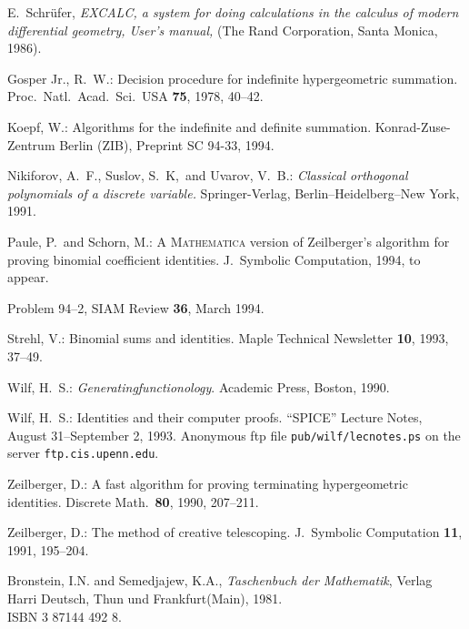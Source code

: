 \begin{thebibliography}{999}
	E.~Schr{\"u}fer, {\em
	EXCALC, a system for doing calculations in the calculus of modern
	differential geometry, User's manual,}
	(The Rand Corporation, Santa Monica, 1986).


Gosper Jr., R.\ W.:
Decision procedure for indefinite hypergeometric
summation. Proc.\ Natl.\ Acad.\ Sci.\ USA \textbf{75}, 1978, 40--42.

Koepf, W.:
Algorithms for the indefinite and definite summation.
Konrad-Zuse-Zentrum Berlin (ZIB), Preprint SC 94-33, 1994.


Nikiforov, A.\ F., Suslov, S.\ K,\ and Uvarov, V.\ B.: {\sl Classical
orthogonal polynomials of a discrete variable.} Springer-Verlag,
Berlin--Heidelberg--New York, 1991.

Paule, P.\ and Schorn, M.: A \textsc{Mathematica} version of Zeilberger's
algorithm for proving binomial coefficient identities. J.\ Symbolic
Computation, 1994, to appear.

Problem 94--2, SIAM Review \textbf{36}, March 1994.

Strehl, V.:
Binomial sums and identities. Maple Technical Newsletter \textbf{10}, 1993, 37--49.

Wilf, H.\ S.:
{\sl Generatingfunctionology}. Academic Press, Boston, 1990.

Wilf, H.\ S.:
Identities and their computer proofs. ``SPICE'' Lecture Notes,
August 31--September 2, 1993.
Anonymous ftp file \texttt{pub/wilf/lecnotes.ps} on
the server \texttt{ftp.cis.upenn.edu}.

Zeilberger, D.:
A fast algorithm for proving terminating hypergeometric identities.
Discrete Math.\ \textbf{80}, 1990, 207--211.

Zeilberger, D.:
The method of creative telescoping.
J.\ Symbolic Computation \textbf{11}, 1991, 195--204.


 Bronstein, I.N. and Semedjajew, K.A.,
{\it Taschenbuch der Mathematik},
Verlag Harri Deutsch, Thun und Frankfurt(Main),
 1981.\\ISBN 3 87144 492 8.

\end{thebibliography}
